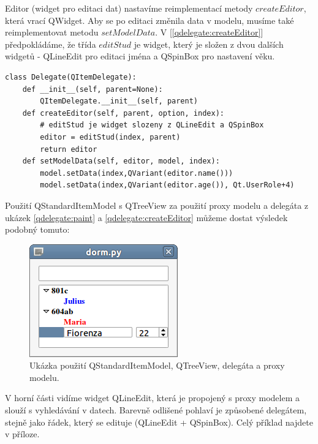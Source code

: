 Editor (widget pro editaci dat) nastavíme reimplementací metody $createEditor$, která vrací QWidget. Aby se po editaci změnila data v modelu, musíme také reimplementovat metodu $setModelData$. V [\lstlistingname \ref{qdelegate:createEditor}] předpokládáme, že třída $editStud$ je widget, který je složen z dvou dalších widgetů - QLineEdit pro editaci jména a QSpinBox pro nastavení věku. \\
\newpage
\begin{lstlisting}[label=qdelegate:createEditor,caption={Delegate - přepsání metod $createEditor$ a $setModelData$}, morekeywords={QItemDelegate, Qt, QFont, AlignLeft, DisplayRole, UserRole, QPen}]
class Delegate(QItemDelegate):
    def __init__(self, parent=None):
        QItemDelegate.__init__(self, parent)
    def createEditor(self, parent, option, index):
    	# editStud je widget slozeny z QLineEdit a QSpinBox
        editor = editStud(index, parent)
        return editor    
    def setModelData(self, editor, model, index):
        model.setData(index,QVariant(editor.name()))
        model.setData(index,QVariant(editor.age()), Qt.UserRole+4)
\end{lstlisting}

Použití QStandardItemModel s QTreeView za použití proxy modelu a delegáta z ukázek \ref{qdelegate:paint} a \ref{qdelegate:createEditor} můžeme dostat výsledek podobný tomuto:

\begin{figure}[h]
	\centering
	\includegraphics[scale=0.7]{pictures/qt/dorm}
	\caption{Ukázka použití QStandardItemModel, QTreeView, delegáta a proxy modelu.}
	\label{pic:delegate}
\end{figure} 

\noindent
V horní části vidíme widget QLineEdit, která je propojený s proxy modelem a slouží s vyhledávání v datech. Barevně odlišené pohlaví je způsobené delegátem, stejně jako řádek, který se edituje (QLineEdit + QSpinBox). Celý příklad najdete v příloze.

